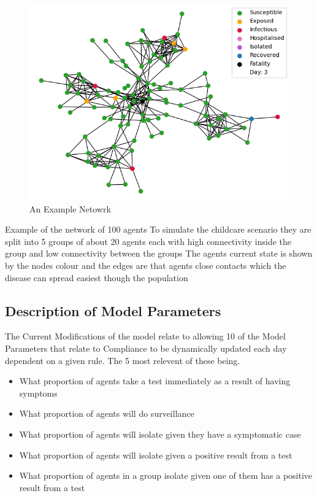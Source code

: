 \documentclass{article}
\begin{document}
\newpage

\begin{figure}
  \centering
      \includegraphics[width=\textwidth]{network}
  \caption{An Example Netowrk}
\end{figure}

Example of the network of 100 agents
To simulate the childcare scenario they are split into 5 groups of about 20 agents each with high connectivity inside the group and low connectivity between the groups 
The agents current state is shown by the nodes colour and the edges are that agents close contacts which the disease can spread easiest though the population


\subsection{Description of Model Parameters}
The Current Modifications of the model relate to allowing 10 of the Model Parameters that relate to Compliance to be dynamically updated each day dependent on a given rule. The 5 most relevent of these being.
\begin{itemize}
\item What proportion of agents take a test immediately as a result of having symptoms
\item What proportion of agents will do surveillance
\item What proportion of agents will isolate given they have a symptomatic case
\item What proportion of agents will isolate given a positive result from a test
\item What proportion of agents in a group isolate given one of them has a positive result from a test
\end{itemize}
\end{document}
